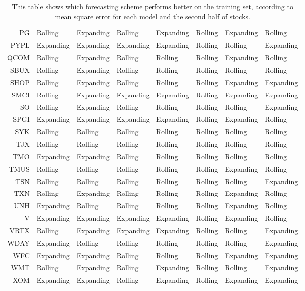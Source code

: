 \begin{table}[ht]
\begin{tabular}{rlllllll}
  PG & Rolling & Expanding & Rolling & Expanding & Rolling & Expanding & Rolling \\ 
  PYPL & Expanding & Expanding & Expanding & Expanding & Rolling & Rolling & Expanding \\ 
  QCOM & Rolling & Expanding & Rolling & Rolling & Rolling & Expanding & Rolling \\ 
  SBUX & Rolling & Expanding & Rolling & Rolling & Rolling & Rolling & Rolling \\ 
  SHOP & Rolling & Expanding & Rolling & Rolling & Rolling & Expanding & Expanding \\ 
  SMCI & Rolling & Expanding & Expanding & Expanding & Rolling & Expanding & Expanding \\ 
  SO & Rolling & Expanding & Rolling & Rolling & Rolling & Rolling & Expanding \\ 
  SPGI & Expanding & Expanding & Expanding & Expanding & Rolling & Expanding & Rolling \\ 
  SYK & Rolling & Rolling & Rolling & Rolling & Rolling & Rolling & Rolling \\ 
  TJX & Rolling & Rolling & Rolling & Rolling & Rolling & Rolling & Rolling \\ 
  TMO & Expanding & Expanding & Rolling & Rolling & Rolling & Rolling & Rolling \\ 
  TMUS & Rolling & Rolling & Rolling & Rolling & Rolling & Expanding & Rolling \\ 
  TSN & Rolling & Rolling & Rolling & Rolling & Rolling & Rolling & Expanding \\ 
  TXN & Rolling & Expanding & Rolling & Rolling & Rolling & Expanding & Rolling \\ 
  UNH & Expanding & Rolling & Rolling & Rolling & Rolling & Expanding & Rolling \\ 
  V & Expanding & Expanding & Expanding & Expanding & Rolling & Expanding & Rolling \\ 
  VRTX & Rolling & Expanding & Expanding & Expanding & Rolling & Rolling & Expanding \\ 
  WDAY & Expanding & Rolling & Rolling & Rolling & Rolling & Rolling & Expanding \\ 
  WFC & Expanding & Expanding & Rolling & Rolling & Rolling & Expanding & Expanding \\ 
  WMT & Rolling & Expanding & Rolling & Expanding & Rolling & Rolling & Expanding \\ 
  XOM & Expanding & Expanding & Rolling & Expanding & Rolling & Expanding & Expanding \\ 
   \hline
\end{tabular}
\caption[Better scheme MSE (2)]{This table shows which forecasting scheme performs better on the training set, according to mean square error
              for each model and the second half of stocks.} 
\label{Table:Better_MSE_2}
\end{table}
